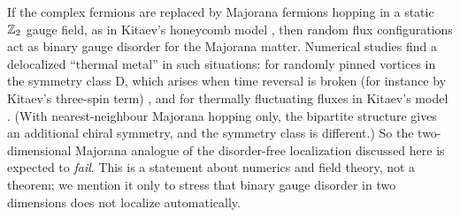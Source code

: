 \begin{remark}\label{rem:majorana}
If the complex fermions are replaced by Majorana fermions hopping in a static $\mathbb{Z}_2$ gauge field, as in Kitaev's
honeycomb model \cite{Kitaev2006}, then random flux configurations act as binary gauge disorder for the Majorana
matter.  Numerical studies find a delocalized ``thermal metal'' in such situations: for randomly pinned vortices in
the symmetry class D, which arises when time reversal is broken (for instance by Kitaev's three-spin term)
\cite{Laumann2012}, and for thermally fluctuating fluxes in Kitaev's model \cite{Self2019}.  (With nearest-neighbour
Majorana hopping only, the bipartite structure gives an additional chiral symmetry, and the symmetry class is
different.)  So the two-dimensional
Majorana analogue of the disorder-free localization discussed here is expected to \emph{fail}.  This is a
statement about numerics and field theory, not a theorem; we mention it only to stress that binary gauge disorder
in two dimensions does not localize automatically.
\end{remark}
